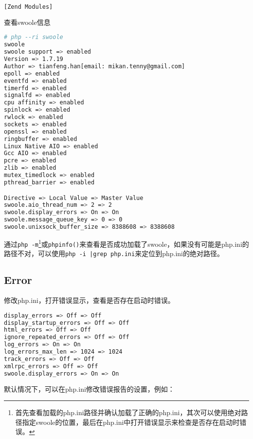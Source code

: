 \begin{compactenum}
\begin{lstlisting}[language=bash]
[Zend Modules]
\end{lstlisting}

\item 查看swoole信息

\begin{lstlisting}[language=bash]
# php --ri swoole
swoole
swoole support => enabled
Version => 1.7.19
Author => tianfeng.han[email: mikan.tenny@gmail.com]
epoll => enabled
eventfd => enabled
timerfd => enabled
signalfd => enabled
cpu affinity => enabled
spinlock => enabled
rwlock => enabled
sockets => enabled
openssl => enabled
ringbuffer => enabled
Linux Native AIO => enabled
Gcc AIO => enabled
pcre => enabled
zlib => enabled
mutex_timedlock => enabled
pthread_barrier => enabled

Directive => Local Value => Master Value
swoole.aio_thread_num => 2 => 2
swoole.display_errors => On => On
swoole.message_queue_key => 0 => 0
swoole.unixsock_buffer_size => 8388608 => 8388608
\end{lstlisting}
\end{compactenum}



通过\texttt{php -m}\footnote{首先查看加载的php.ini路径并确认加载了正确的php.ini，其次可以使用绝对路径指定swoole的位置，最后在php.ini中打开错误显示来检查是否存在启动时错误。}或\texttt{phpinfo()}来查看是否成功加载了swoole，如果没有可能是php.ini的路径不对，可以使用\texttt{php -i |grep php.ini}来定位到php.ini的绝对路径。

\subsection{Error}


修改php.ini，打开错误显示，查看是否存在启动时错误。

\begin{lstlisting}[language=bash]
display_errors => Off => Off
display_startup_errors => Off => Off
html_errors => Off => Off
ignore_repeated_errors => Off => Off
log_errors => On => On
log_errors_max_len => 1024 => 1024
track_errors => Off => Off
xmlrpc_errors => Off => Off
swoole.display_errors => On => On
\end{lstlisting}

默认情况下，可以在php.ini修改错误报告的设置，例如：

